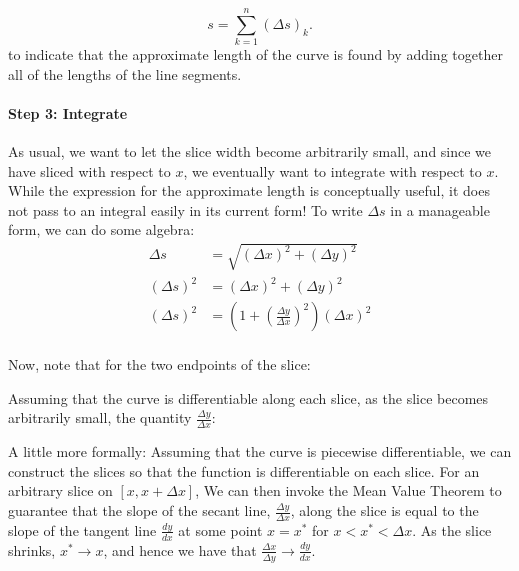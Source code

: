 \documentclass{ximera}
\begin{document}
\begin{model}
\begin{explanation}
\[ 
s = \sum_{k=1}^n (\Delta s)_k.
\]
to indicate that the approximate length of the curve is found by adding together all of the lengths of the line segments.

\paragraph{Step 3: Integrate}
As usual, we want to let the slice width become arbitrarily small, and since we have sliced with respect to $x$, we eventually want to integrate with respect to $x$.  While the expression for the approximate length is conceptually useful, it does not pass to an integral easily in its current form!  To write $\Delta s$ in a manageable form, we can do some algebra:
\begin{align*}
	\Delta s  &= \sqrt{(\Delta x)^2+(\Delta y)^2}\\
	\left( \Delta s \right)^2 &= \left( \Delta x \right)^2 + \left( \Delta y \right)^2\\
	\left( \Delta s \right)^2 &= \left( 1 + \left( \frac{\Delta y}{\Delta x} \right)^2 \right) \left( \Delta x\right)^2\\
\end{align*}

Now, note that for the two endpoints of the slice:

\begin{multipleChoice}
\end{multipleChoice}

Assuming that the curve is differentiable along each slice, as the slice becomes arbitrarily small, the quantity $\frac{\Delta y}{\Delta x}$:

\begin{multipleChoice}
\end{multipleChoice}

\begin{remark}
A little more formally: Assuming that the curve is piecewise differentiable, we can construct the slices so that the function is differentiable on each slice.  For an arbitrary slice on $[x, x+\Delta x]$, We can then invoke the Mean Value Theorem to guarantee that the slope of the secant line, $\frac{\Delta y}{\Delta x}$, along the slice is equal to the slope of the tangent line $\frac{dy}{dx}$ at some point $x=x^*$ for $x<x^*<\Delta x$.  As the slice shrinks, $x^* \rightarrow x$, and hence we have that $\frac{\Delta x}{\Delta y} \rightarrow \frac{dy}{dx}$.
\end{remark}



\end{explanation}
\end{model}
\end{document}
